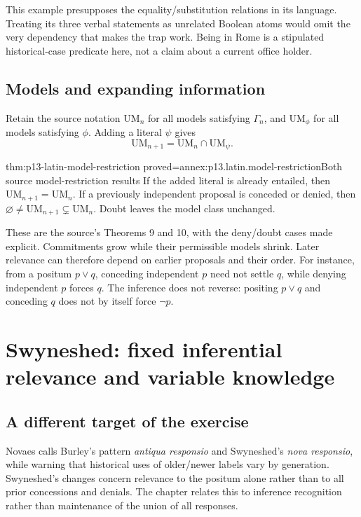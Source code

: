 This example presupposes the equality/substitution relations in its
language. Treating its three verbal statements as unrelated Boolean
atoms would omit the very dependency that makes the trap work.
Being in Rome is a stipulated historical-case predicate here, not a
claim about a current office holder.

\subsection{Models and expanding information}

Retain the source notation \(\mathrm{UM}_n\) for all models satisfying
\(\Gamma_n\), and \(\mathrm{UM}_{\phi}\) for all models satisfying \(\phi\).
Adding a literal \(\psi\) gives
\[
 \mathrm{UM}_{n+1}=\mathrm{UM}_n\cap\mathrm{UM}_{\psi}.
\]

\begin{hblemma}{thm:p13-latin-model-restriction}
 {proved=annex:p13.latin.model-restriction}{Both source model-restriction results}
If the added literal is already entailed, then
\(\mathrm{UM}_{n+1}=\mathrm{UM}_n\).
If a previously independent proposal is conceded or denied, then
\(\varnothing\ne\mathrm{UM}_{n+1}\subsetneq\mathrm{UM}_n\).
Doubt leaves the model class unchanged.
\end{hblemma}

These are the source's Theorems 9 and 10, with the deny/doubt cases made
explicit. Commitments grow while their permissible models shrink.
Later relevance can therefore depend on earlier proposals and their order.
For instance, from a positum \(p\lor q\), conceding independent \(p\)
need not settle \(q\), while denying independent \(p\) forces \(q\).
The inference does not reverse: positing \(p\lor q\) and conceding \(q\)
does not by itself force \(\neg p\).

\section{Swyneshed: fixed inferential relevance and variable knowledge}
\label{sec:p13-latin-swyneshed-obligations}

\subsection{A different target of the exercise}

Novaes calls Burley's pattern \emph{antiqua responsio} and Swyneshed's
\emph{nova responsio}, while warning that historical uses of older/newer
labels vary by generation. Swyneshed's changes concern relevance to the
positum alone rather than to all prior concessions and denials.
The chapter relates this to inference recognition rather than maintenance
of the union of all responses.

